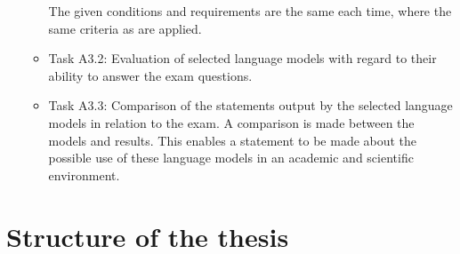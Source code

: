 \begin{itemize}
\begin{itemize}
          The given conditions and requirements are the same each time, where the same criteria as \citet{Paul_Keller} are applied.
          \item Task A3.2: Evaluation of selected language models with regard to their ability to answer the exam questions.
          \item Task A3.3:
          Comparison of the statements output by the selected language models in relation to the exam.
          A comparison is made between the models and \citet{Paul_Keller} results.
          This enables a statement to be made about the possible use of these language models in an academic and scientific environment.
        \end{itemize}
\end{itemize}



\section{Structure of the thesis}
